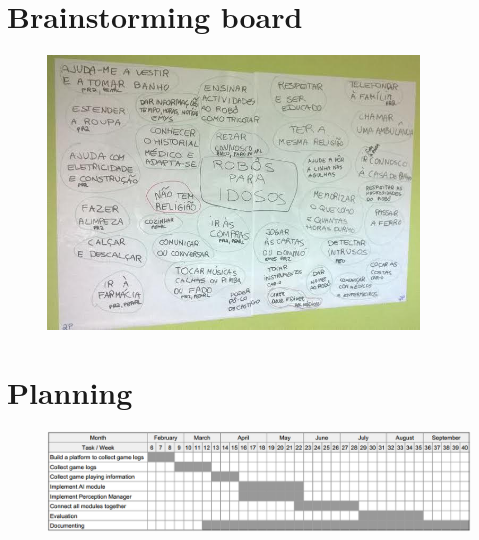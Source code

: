 \section{Brainstorming board}
\label{app:brainstorming}

\begin{figure}
    \centering
    \includegraphics[angle=90, width=0.88\textwidth]{./img/brainstorming}
\end{figure}

\clearpage
\section{Planning}
\label{app:planning}


\begin{figure}
    \centering
    \includegraphics[angle=90, height=0.75\textheight]{./img/planning}
\end{figure}

